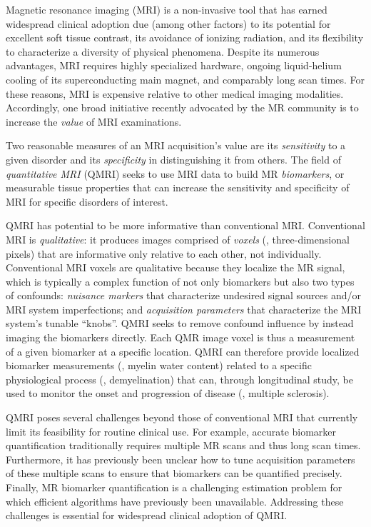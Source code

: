 
Magnetic resonance imaging (MRI)
is a non-invasive tool
that has earned widespread clinical adoption
due (among other factors) 
to its potential for excellent soft tissue contrast,
its avoidance of ionizing radiation,
and its flexibility to characterize 
a diversity of physical phenomena. 
Despite its numerous advantages,
MRI requires highly specialized hardware,
ongoing liquid-helium cooling
of its superconducting main magnet,
and comparably long scan times.
For these reasons,
MRI is expensive relative
to other medical imaging modalities.
Accordingly,
one broad initiative 
recently advocated by the MR community 
is to increase the \emph{value}
of MRI examinations.

Two reasonable measures
of an MRI acquisition's value
are its \emph{sensitivity}
to a given disorder
and its \emph{specificity}
in distinguishing it
from others.
The field of \emph{quantitative MRI} (QMRI)
seeks to use MRI data 
to build MR \emph{biomarkers},
or measurable tissue properties
that can increase the sensitivity and specificity of MRI
for specific disorders of interest.

QMRI has potential
to be more informative than conventional MRI.
Conventional MRI is \emph{qualitative}:
it produces images comprised of \emph{voxels}
(\ie, three-dimensional pixels)
that are informative only relative to each other,
not individually.
Conventional MRI voxels are qualitative
because they localize the MR signal,
which is typically a complex function
of not only biomarkers
but also two types of confounds:
\emph{nuisance markers}
that characterize undesired signal sources
and/or MRI system imperfections;
and \emph{acquisition parameters}
that characterize the MRI system's tunable ``knobs''. 
QMRI seeks to remove confound influence
by instead imaging the biomarkers directly.
Each QMR image voxel
is thus a measurement 
of a given biomarker
at a specific location.
QMRI can therefore provide localized biomarker measurements
(\eg, myelin water content)
related to a specific physiological process
(\eg, demyelination)
that can, through longitudinal study,
be used to monitor the onset and progression of disease
(\eg, multiple sclerosis). 

QMRI poses several challenges
beyond those of conventional MRI 
that currently limit its feasibility 
for routine clinical use.
For example,
accurate biomarker quantification 
traditionally requires multiple MR scans
and thus long scan times.
Furthermore,
it has previously been unclear
how to tune acquisition parameters 
of these multiple scans
to ensure that biomarkers can be quantified precisely.
Finally, MR biomarker quantification
is a challenging estimation problem
for which efficient algorithms
have previously been unavailable.
Addressing these challenges is essential
for widespread clinical adoption of QMRI.

